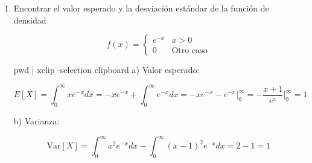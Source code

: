 \documentclass[a4paper, 12pt]{article}
\newcommand{\Aspace}{0.2cm}
\begin{document}
    \begin{enumerate}
        \item Encontrar el valor esperado y la desviación estándar de la función de densidad \par
        \[
            f(x) =
            \begin{cases}
                e^{-x} & x > 0 \\
                0 & \text{Otro caso}
            \end{cases}
        \]
            \vspace{\Aspace}
            { \color{azul} 
                \begin{flushleft}
pwd | xclip -selection clipboard
                    a) Valor esperado:
                \end{flushleft}
                \[
                    E[X] 
                    = \int_{0}^{\infty} xe^{-x}dx
                    = -xe^{-x} + \int_{0}^{\infty} e^{-x}dx
                    = -xe^{-x}-e^{-x} \Big|_{0}^{\infty}
                    = -\frac{x + 1}{e^{x}} \Big|_{0}^{\infty}
                    = 1
                \]

                \begin{flushleft}
                    b) Varianza:
                \end{flushleft}
                \[
                    \text{Var}[X]
                    = \int_{0}^{\infty} x^{2}e^{-x}dx - \int_{0}^{\infty}(x - 1)^{2}e^{-x}dx
                    = 2 - 1
                    = 1
                \]
            }


\end{enumerate}
\end{document}
